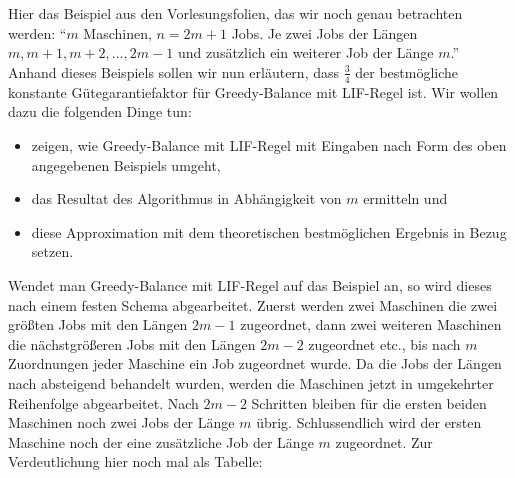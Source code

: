 \documentclass[a4paper]{article}
\begin{document}
		
	\section{}
	
	Hier das Beispiel aus den Vorlesungsfolien, das wir noch genau betrachten werden: \n
	"`$m$ Maschinen, $n = 2m + 1$ Jobs. Je zwei Jobs der Längen $m, m + 1, m + 2, \dots , 2m - 1$ und zusätzlich ein weiterer Job der Länge $m$."' \n
	Anhand dieses Beispiels sollen wir nun erläutern, dass $\frac{3}{4}$ der bestmögliche konstante Gütegarantiefaktor für Greedy-Balance mit LIF-Regel ist. \n
	Wir wollen dazu die folgenden Dinge tun:
	\begin{itemize}
	\item zeigen, wie Greedy-Balance mit LIF-Regel mit Eingaben nach Form des oben angegebenen Beispiels umgeht,
	\item das Resultat des Algorithmus in Abhängigkeit von $m$ ermitteln und
	\item diese Approximation mit dem theoretischen bestmöglichen Ergebnis in Bezug setzen.
	\end{itemize}
	Wendet man Greedy-Balance mit LIF-Regel auf das Beispiel an, so wird dieses nach einem festen Schema abgearbeitet. Zuerst werden zwei Maschinen die zwei größten Jobs mit den Längen $2m -1$ zugeordnet, dann zwei weiteren Maschinen die nächstgrößeren Jobs mit den Längen $2m - 2$ zugeordnet etc., bis nach $m$ Zuordnungen jeder Maschine ein Job zugeordnet wurde. Da die Jobs der Längen nach absteigend behandelt wurden, werden die Maschinen jetzt in umgekehrter Reihenfolge abgearbeitet. Nach $2m - 2$ Schritten bleiben für die ersten beiden Maschinen noch zwei Jobs der Länge $m$ übrig. Schlussendlich wird der ersten Maschine noch der eine zusätzliche Job der Länge $m$ zugeordnet. \n
	Zur Verdeutlichung hier noch mal als Tabelle:
\end{document}
